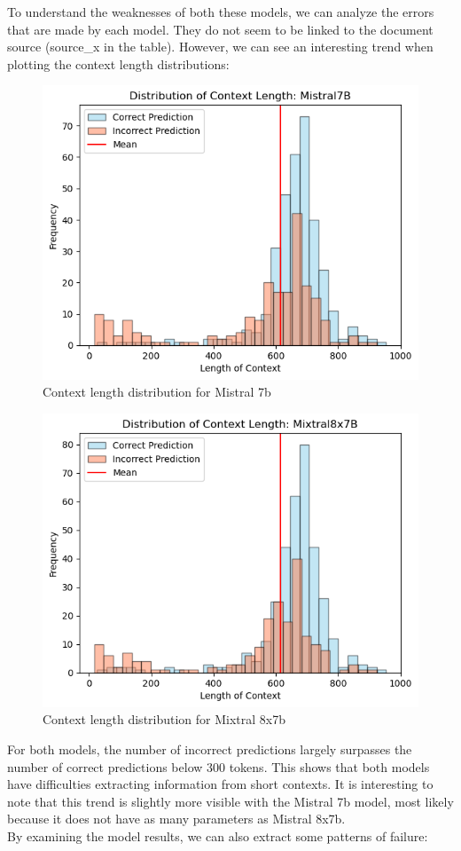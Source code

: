 \documentclass[11pt]{article}
\begin{document}
To understand the weaknesses of both these models, we can analyze the errors that are made by each model. They do not seem to be linked to the document source (source\_x in the table). However, we can see an interesting trend when plotting the context length distributions:\\


\begin{figure}[h]
    \centering
    \includegraphics[width=0.45\linewidth]{images//mistral//binary/mistral7b_context.png}
    \caption{Context length distribution for Mistral 7b}
    \label{fig:enter-label}
\end{figure}

\newpage

\begin{figure}[h]
    \centering
    \includegraphics[width=0.45\linewidth]{images//mistral//binary/mistral8x7b_context.png}
    \caption{Context length distribution for Mixtral 8x7b}
    \label{fig:enter-label}
\end{figure}

For both models, the number of incorrect predictions largely surpasses the number of correct predictions below 300 tokens. This shows that both models have difficulties extracting information from short contexts. It is interesting to note that this trend is slightly more visible with the Mistral 7b model, most likely because it does not have as many parameters as Mistral 8x7b.\\

By examining the model results, we can also extract some patterns of failure:
\end{document}

